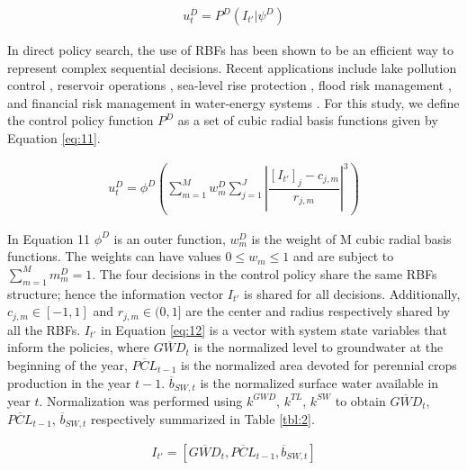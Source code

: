 \documentclass[a4paper,fleqn]{cas-sc}
\begin{document}
\begin{align}
u_{t}^D = P^{D}(I_{t'}|\psi^{D})
\end{align}

In direct policy search, the use of RBFs has been shown to be an efficient way to represent complex sequential decisions. Recent applications include lake pollution control \citep{quinn_direct_2017}, reservoir operations \citep{giuliani_universal_2014, zatarain_salazar_balancing_2017,giuliani_state---art_2021}, sea-level rise protection \citep{garner_using_2018}, flood risk management \citep{wang_incorporating_2023}, and financial risk management in water-energy systems \citep{gupta_can_2020,hamilton_stream_2022}. For this study, we define the control policy function $P^D$ as a set of cubic radial basis functions given by Equation \ref{eq:11}.

\begin{align}\label{eq:11}
u_{t}^D = \phi^{D}\left(\sum_{m=1}^M w_{m}^D \sum_{j=1}^J \left\lvert\dfrac{[I_{t'}]_{j}-c_{j,m}}{r_{j,m}}\right\rvert^{3}\right)
\end{align}

In Equation 11 $\phi^{D}$ is an outer function, $w_{m}^D$ is the weight of M cubic radial basis functions. The weights can have values $ 0 \leq w_{m} \leq 1$ and are subject to $\sum_{m=1}^M m_{m}^D= 1$. The four decisions in the control policy share the same RBFs structure; hence the information vector $I_{t'}$ is shared for all decisions. Additionally, $c_{j,m} \in [-1,1]$ and $r_{j,m} \in (0,1]$ are the center and radius respectively shared by all the RBFs. $I_{t'}$ in Equation \ref{eq:12} is a vector with system state variables that inform the policies, where $\overline{GWD}_{t}$ is the normalized level to groundwater at the beginning of the year, $\overline{PCL}_{t-1}$ is the normalized area devoted for perennial crops production in the year $t-1$. $\overline{b}_{SW,t}$ is the normalized surface water available in year $t$. Normalization was performed using $k^{GWD}$, $k^{TL}$, $k^{SW}$ to obtain $\overline{GWD}_{t}$, $\overline{PCL}_{t-1}$, $\overline{b}_{SW,t}$ respectively summarized in Table \ref{tbl:2}.

\begin{align}\label{eq:12}
I_{t'} = [\overline{GWD}_{t},\overline{PCL}_{t-1},\overline{b}_{SW,t}]
\end{align}
\end{document}
